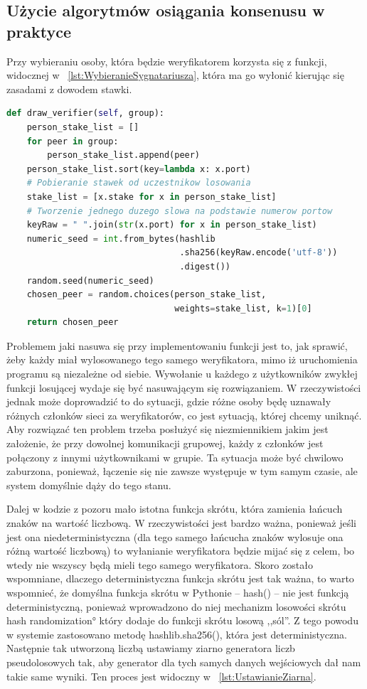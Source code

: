 \subsection{Użycie algorytmów osiągania konsenusu w praktyce}
\label{ssec:KonsensusUzycie}
Przy wybieraniu osoby, która będzie weryfikatorem korzysta się z funkcji, widocznej w \lstlistingname{~\ref{lst:WybieranieSygnatariusza}}, która ma go wyłonić kierując się zasadami z dowodem stawki.

\begin{lstlisting}[language=Python, extendedchars=true, caption={Funkcja wybierająca sygnatariusza}, label={lst:WybieranieSygnatariusza}]
def draw_verifier(self, group):
    person_stake_list = []
    for peer in group:
        person_stake_list.append(peer)
    person_stake_list.sort(key=lambda x: x.port)
    # Pobieranie stawek od uczestnikow losowania
    stake_list = [x.stake for x in person_stake_list]
    # Tworzenie jednego duzego slowa na podstawie numerow portow
    keyRaw = " ".join(str(x.port) for x in person_stake_list)
    numeric_seed = int.from_bytes(hashlib
                                  .sha256(keyRaw.encode('utf-8'))
                                  .digest())
    random.seed(numeric_seed)
    chosen_peer = random.choices(person_stake_list,
                                 weights=stake_list, k=1)[0]
    return chosen_peer
\end{lstlisting} 
 Problemem jaki nasuwa się przy implementowaniu funkcji jest to, jak sprawić, żeby każdy miał wylosowanego tego samego weryfikatora, mimo iż uruchomienia programu są niezależne od siebie. Wywołanie u każdego z użytkowników zwykłej funkcji losującej wydaje się być nasuwającym się rozwiązaniem. W rzeczywistości jednak może doprowadzić to do sytuacji, gdzie różne osoby będę uznawały różnych członków sieci za weryfikatorów, co jest sytuacją, której chcemy uniknąć. Aby rozwiązać ten problem trzeba posłużyć się niezmiennikiem jakim jest założenie, że przy dowolnej komunikacji grupowej, każdy z członków jest połączony z innymi użytkownikami w grupie. Ta sytuacja może być chwilowo zaburzona, ponieważ, łączenie się nie zawsze występuje w tym samym czasie, ale system domyślnie dąży do tego stanu.

Dalej w kodzie z pozoru mało istotna funkcja skrótu, która zamienia łańcuch znaków na wartość liczbową. W rzeczywistości jest bardzo ważna, ponieważ jeśli jest ona niedeterministyczna (dla tego samego łańcucha znaków wylosuje ona różną wartość liczbową) to wyłanianie weryfikatora będzie mijać się z celem, bo wtedy nie wszyscy będą mieli tego samego weryfikatora. Skoro zostało wspomniane, dlaczego deterministyczna funkcja skrótu jest tak ważna, to warto wspomnieć, że domyślna funkcja skrótu w Pythonie – hash() – nie jest funkcją deterministyczną, ponieważ wprowadzono do niej mechanizm losowości skrótu \ang{hash randomization} który dodaje do funkcji skrótu losową ,,sól”. Z tego powodu w systemie zastosowano metodę hashlib.sha256(), która jest deterministyczna. Następnie tak utworzoną liczbą ustawiamy ziarno generatora liczb pseudolosowych tak, aby generator dla tych samych danych wejściowych dał nam takie same wyniki. Ten proces jest widoczny w \lstlistingname{~\ref{lst:UstawianieZiarna}}.

